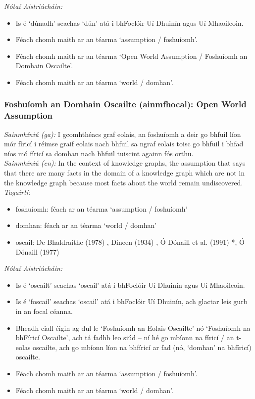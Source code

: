 \noindent \textit{Nótaí Aistriúcháin:}
\begin{itemize}
	\item Is é `dúnadh' seachas `dún' atá i bhFoclóir Uí Dhuinín agus Uí Mhaoileoin.
	\item Féach chomh maith ar an téarma `assumption / foshuíomh'.
	\item Féach chomh maith ar an téarma `Open World Assumption / Foshuíomh an Domhain Oscailte'.
	\item Féach chomh maith ar an téarma `world / domhan'.
\end{itemize}


\subsubsection*{Foshuíomh an Domhain Oscailte (ainmfhocal): Open World Assumption}
 \noindent \textit{Sainmhíniú (ga):} I gcomhthéacs graf eolais, an foshuíomh a deir go bhfuil líon mór fíricí i réimse graif eolais nach bhfuil sa ngraf eolais toisc go bhfuil i bhfad níos mó fíricí sa domhan nach bhfuil tuiscint againn fós orthu.
\\
 \noindent \textit{Sainmhíniú (en):} In the context of knowledge graphs, the assumption that says that there are many facts in the domain of a knowledge graph which are not in the knowledge graph because most facts about the world remain undiscovered.
\\
 \noindent \textit{Tagairtí:}
\begin{itemize}
	\item foshuíomh: féach ar an téarma `assumption / foshuíomh'
	\item domhan: féach ar an téarma `world / domhan'
	\item oscail: De Bhaldraithe (1978) \cite{de-bhaldraithe}, Dineen (1934) \cite{dineen}, Ó Dónaill et al. (1991) \cite{focloir-beag}*, Ó Dónaill (1977) \cite{odonaill}
\end{itemize}

 \noindent \textit{Nótaí Aistriúcháin:}
\begin{itemize}
	\item Is é `oscailt' seachas `oscail' atá i bhFoclóir Uí Dhuinín agus Uí Mhaoileoin.
	\item Is é `foscail' seachas `oscail' atá i bhFoclóir Uí Dhuinín, ach glactar leis gurb in an focal céanna.
	\item Bheadh ciall éigin ag dul le `Foshuíomh an Eolais Oscailte' nó `Foshuíomh na bhFíricí Oscailte', ach tá fadhb leo siúd -- ní hé go mbíonn na fíricí / an t-eolas oscailte, ach go mbíonn líon na bhfíricí ar fad (nó, `domhan' na bhfíricí) oscailte.
	\item Féach chomh maith ar an téarma `assumption / foshuíomh'.
	\item Féach chomh maith ar an téarma `world / domhan'.
\end{itemize}


